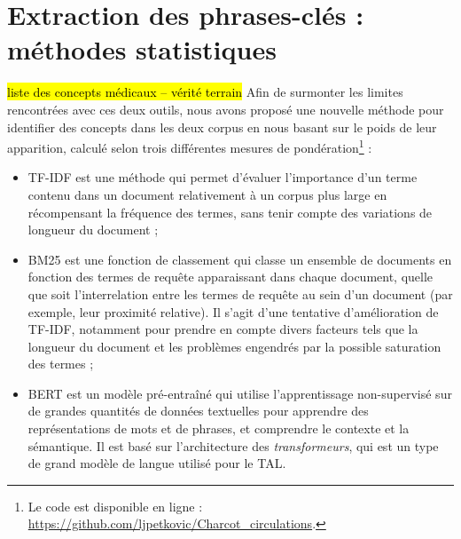 











\section{Extraction des phrases-clés : méthodes statistiques}
\label{sect:methodo_stat}

\hl{liste des concepts médicaux -- vérité terrain}
Afin de surmonter les limites rencontrées avec ces deux outils, nous avons proposé une nouvelle méthode pour identifier des concepts dans les deux corpus en nous basant sur le poids de leur apparition, calculé selon trois différentes mesures de pondération\footnote{Le code est disponible en ligne : \url{https://github.com/ljpetkovic/Charcot\_circulations}.} :
\begin{itemize}
\item \textsc{TF-IDF} est une méthode qui permet d'évaluer l'importance d'un terme contenu dans un document relativement à un corpus plus large en récompensant la fréquence des termes, sans tenir compte des variations de longueur du document ;
\item \textsc{BM25} est une fonction de classement qui classe un ensemble de documents en fonction des termes de requête apparaissant dans chaque document, quelle que soit l'interrelation entre les termes de requête au sein d'un document (par exemple, leur proximité relative). Il s'agit d'une tentative d'amélioration de \textsc{TF-IDF}, notamment pour prendre en compte divers facteurs tels que la longueur du document et les problèmes engendrés par la possible saturation des termes \citep[p.~355]{robertson2009probabilistic} ;
\item \textsc{BERT} \citep{devlin2019} est un modèle pré-entraîné qui utilise l'apprentissage non-supervisé sur de grandes quantités de données textuelles pour apprendre des représentations de mots et de phrases, et comprendre le contexte et la sémantique. Il est basé sur l'architecture des \textit{transformeurs}, qui est un type de grand modèle de langue utilisé pour le \textsc{TAL}.
\end{itemize}

